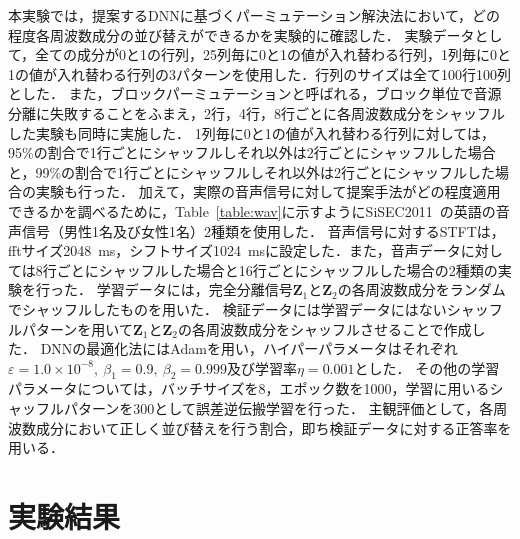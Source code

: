 本実験では，提案するDNNに基づくパーミュテーション解決法において，どの程度各周波数成分の並び替えができるかを実験的に確認した．
実験データとして，全ての成分が0と1の行列，25列毎に0と1の値が入れ替わる行列，1列毎に0と1の値が入れ替わる行列の3パターンを使用した．行列のサイズは全て100行100列とした．
また，ブロックパーミュテーションと呼ばれる，ブロック単位で音源分離に失敗することをふまえ，2行，4行，8行ごとに各周波数成分をシャッフルした実験も同時に実施した．
1列毎に0と1の値が入れ替わる行列に対しては，95\%の割合で1行ごとにシャッフルしそれ以外は2行ごとにシャッフルした場合と，99\%の割合で1行ごとにシャッフルしそれ以外は2行ごとにシャッフルした場合の実験も行った．
加えて，実際の音声信号に対して提案手法がどの程度適用できるかを調べるために，Table~\ref{table:wav}に示すようにSiSEC2011~\cite{Sisec}の英語の音声信号（男性1名及び女性1名）2種類を使用した．
音声信号に対するSTFTは，fftサイズ2048~ms，シフトサイズ1024~msに設定した．また，音声データに対しては8行ごとにシャッフルした場合と16行ごとにシャッフルした場合の2種類の実験を行った．
学習データには，完全分離信号$\bm{Z}_1$と$\bm{Z}_2$の各周波数成分をランダムでシャッフルしたものを用いた．
検証データには学習データにはないシャッフルパターンを用いて$\bm{Z}_1$と$\bm{Z}_2$の各周波数成分をシャッフルさせることで作成した．
DNNの最適化法にはAdam\cite{adam}を用い，ハイパーパラメータはそれぞれ$\varepsilon=1.0\times10^{-8},~\beta_1 = 0.9,~\beta_2 = 0.999$及び学習率$\eta=0.001$とした．
その他の学習パラメータについては，バッチサイズを8，エポック数を1000，学習に用いるシャッフルパターンを300として誤差逆伝搬学習を行った．
主観評価として，各周波数成分において正しく並び替えを行う割合，即ち検証データに対する正答率を用いる．


\section{実験結果}
\label{sec:ex_res}

